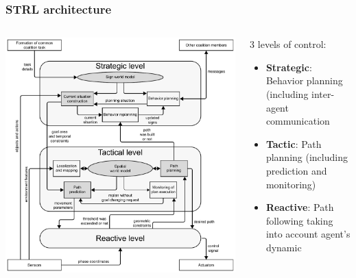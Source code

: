 \documentclass[default]{beamer}
\begin{document}
	\begin{frame}
		\frametitle{STRL architecture}
		
		\begin{columns}
			\begin{column}{0.6\textwidth}
				\centering
				\includegraphics[width=\textwidth]{strl/strl_rita_eng}
			\end{column}
			\begin{column}{0.4\textwidth}
				3 levels of control:
				\begin{itemize}
					\item \textbf{Strategic}: Behavior planning (including inter-agent communication
					\item \textbf{Tactic}: Path planning (including prediction and monitoring)
					\item \textbf{Reactive}: Path following taking into account agent’s dynamic
				\end{itemize}
				\nocite{*}
				\printbibliography[keyword={strl}, resetnumbers=true]
			\end{column}
		\end{columns}
	\end{frame}
\end{document}
